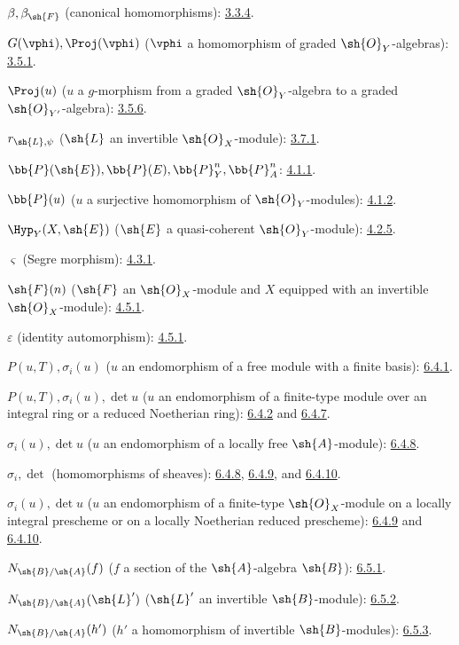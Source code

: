 $\beta,\beta_{\sh{F}}$ (canonical homomorphisms): \hyperref[II.3.3.4]{3.3.4}.

$G(\vphi),\Proj(\vphi)$
($\vphi$ a homomorphism of graded $\sh{O}_Y$-algebras): \hyperref[II.3.5.1]{3.5.1}.

$\Proj(u)$ ($u$ a $g$-morphism from a graded $\sh{O}_Y$-algebra
to a graded $\sh{O}_{Y'}$-algebra): \hyperref[II.3.5.6]{3.5.6}.

$r_{\sh{L},\psi}$ ($\sh{L}$ an invertible $\sh{O}_X$-module): \hyperref[II.3.7.1]{3.7.1}.

$\bb{P}(\sh{E}),\bb{P}(E),\bb{P}_Y^n,\bb{P}_A^n$: \hyperref[II.4.1.1]{4.1.1}.

$\bb{P}(u)$ ($u$ a surjective homomorphism of
$\sh{O}_Y$-modules): \hyperref[II.4.1.2]{4.1.2}.

$\Hyp_Y(X,\sh{E})$ ($\sh{E}$ a quasi-coherent
$\sh{O}_Y$-module): \hyperref[II.4.2.5]{4.2.5}.

$\varsigma$ (Segre morphism): \hyperref[II.4.3.1]{4.3.1}.

$\sh{F}(n)$ ($\sh{F}$ an $\sh{O}_X$-module and $X$ equipped with an
invertible $\sh{O}_X$-module): \hyperref[II.4.5.1]{4.5.1}.

$\varepsilon$ (identity automorphism): \hyperref[II.4.5.1]{4.5.1}.

$P(u,T),\sigma_i(u)$
($u$ an endomorphism of a free module with a finite basis): \hyperref[II.6.4.1]{6.4.1}.

$P(u,T),\sigma_i(u),\det u$
($u$ an endomorphism of a finite-type module over an integral ring or
a reduced Noetherian ring): \hyperref[II.6.4.2]{6.4.2} and \hyperref[II.6.4.7]{6.4.7}.

$\sigma_i(u),\det u$ ($u$ an endomorphism of a locally free
$\sh{A}$-module): \hyperref[II.6.4.8]{6.4.8}.

$\sigma_i,\det$ (homomorphisms of sheaves): \hyperref[II.6.4.8]{6.4.8}, \hyperref[II.6.4.9]{6.4.9}, and \hyperref[II.6.4.10]{6.4.10}.

$\sigma_i(u),\det u$
($u$ an endomorphism of a finite-type $\sh{O}_X$-module on a locally
integral prescheme or on a locally Noetherian reduced prescheme):
\hyperref[II.6.4.9]{6.4.9} and \hyperref[II.6.4.10]{6.4.10}.

$N_{\sh{B}/\sh{A}}(f)$
($f$ a section of the $\sh{A}$-algebra $\sh{B}$): \hyperref[II.6.5.1]{6.5.1}.

$N_{\sh{B}/\sh{A}}(\sh{L}')$
($\sh{L}'$ an invertible $\sh{B}$-module): \hyperref[II.6.5.2]{6.5.2}.

$N_{\sh{B}/\sh{A}}(h')$
($h'$ a homomorphism of invertible $\sh{B}$-modules): \hyperref[II.6.5.3]{6.5.3}.

